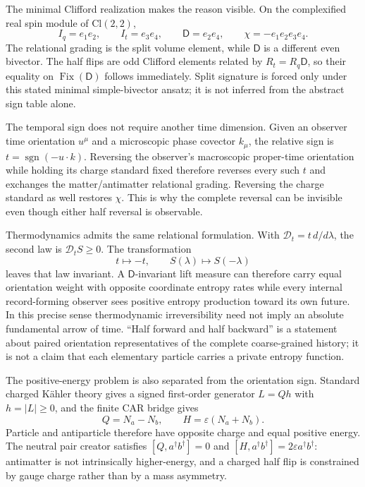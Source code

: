 \documentclass[11pt]{article}
\newcommand{\sgn}{\operatorname{sgn}}
\theoremstyle{definition}\newtheorem{definition}[theorem]{Definition}
\theoremstyle{remark}\newtheorem{remark}[theorem]{Remark}\newtheorem{conjecture}[theorem]{Conjecture}
\begin{document}
The minimal Clifford realization makes the reason visible. On the complexified real spin module of $\mathrm{Cl}(2,2)$,
\begin{equation}
 I_q=e_1e_2,\qquad I_t=e_3e_4,\qquad
 \mathsf D=e_2e_4,\qquad
 \chi=-e_1e_2e_3e_4.
\end{equation}
The relational grading is the split volume element, while $\mathsf D$ is a different even bivector. The half flips are odd Clifford elements related by $R_t=R_q\mathsf D$, so their equality on $\operatorname{Fix}(\mathsf D)$ follows immediately. Split signature is forced only under this stated minimal simple-bivector ansatz; it is not inferred from the abstract sign table alone.

The temporal sign does not require another time dimension. Given an observer time orientation $u^\mu$ and a microscopic phase covector $k_\mu$, the relative sign is $t=\sgn(-u\cdot k)$. Reversing the observer's macroscopic proper-time orientation while holding its charge standard fixed therefore reverses every such $t$ and exchanges the matter/antimatter relational grading. Reversing the charge standard as well restores $\chi$. This is why the complete reversal can be invisible even though either half reversal is observable.

Thermodynamics admits the same relational formulation. With $\mathscr D_t=t\,d/d\lambda$, the second law is $\mathscr D_tS\ge0$. The transformation
\begin{equation}
 t\mapsto-t,\qquad S(\lambda)\mapsto S(-\lambda)
\end{equation}
leaves that law invariant. A $\mathsf D$-invariant lift measure can therefore carry equal orientation weight with opposite coordinate entropy rates while every internal record-forming observer sees positive entropy production toward its own future. In this precise sense thermodynamic irreversibility need not imply an absolute fundamental arrow of time. ``Half forward and half backward'' is a statement about paired orientation representatives of the complete coarse-grained history; it is not a claim that each elementary particle carries a private entropy function.

The positive-energy problem is also separated from the orientation sign. Standard charged K\"ahler theory gives a signed first-order generator $L=Qh$ with $h=|L|\ge0$, and the finite CAR bridge gives
\begin{equation}
 Q=N_a-N_b,\qquad H=\varepsilon(N_a+N_b).
\end{equation}
Particle and antiparticle therefore have opposite charge and equal positive energy. The neutral pair creator satisfies $[Q,a^\dagger b^\dagger]=0$ and $[H,a^\dagger b^\dagger]=2\varepsilon a^\dagger b^\dagger$: antimatter is not intrinsically higher-energy, and a charged half flip is constrained by gauge charge rather than by a mass asymmetry.
\end{document}
